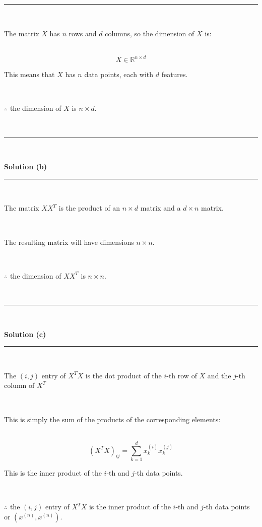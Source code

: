 \documentclass{article}
\begin{document}
\noindent\rule{\textwidth}{0.4pt}\\

\parbox{\textwidth}{The matrix $X$ has $n$ rows and $d$ columns, so the dimension of $X$ is:}\\

$$X \in \mathbb{R}^{n \times d}$$

\parbox{\textwidth}{This means that $X$ has $n$ data points, each with $d$ features.}\\

\parbox{\textwidth}{$\therefore$ the dimension of $X$ is $n \times d$.}\\

\noindent\rule{\textwidth}{0.4pt}\\

\parbox{\textwidth}{\textbf{Solution (b)}}

\noindent\rule{\textwidth}{0.4pt}\\

\parbox{\textwidth}{The matrix ${XX}^T$ is the product of an $n \times d$ matrix and a $d \times n$ matrix.}\\

\parbox{\textwidth}{The resulting matrix will have dimensions $n \times n$.}\\

\parbox{\textwidth}{$\therefore$ the dimension of ${XX}^T$ is $n \times n$.}\\

\noindent\rule{\textwidth}{0.4pt}\\

\parbox{\textwidth}{\textbf{Solution (c)}}

\noindent\rule{\textwidth}{0.4pt}\\

\parbox{\textwidth}{The $(i,j)$ entry of ${X}^TX$ is the dot product of the $i$-th row of $X$ and the $j$-th column of $X^T$ }\\

\parbox{\textwidth}{This is simply the sum of the products of the corresponding elements:}\\

$$(X^TX)_{ij} = \sum_{k=1}^{d} x^{(i)}_k x^{(j)}_k$$

\parbox{\textwidth}{This is the inner product of the $i$-th and $j$-th data points.}\\

\parbox{\textwidth}{$\therefore$ the $(i,j)$ entry of ${X}^TX$ is the inner product of the $i$-th and $j$-th data points or $(x^{(n)},x^{(n)})$.}\\
\end{document}
